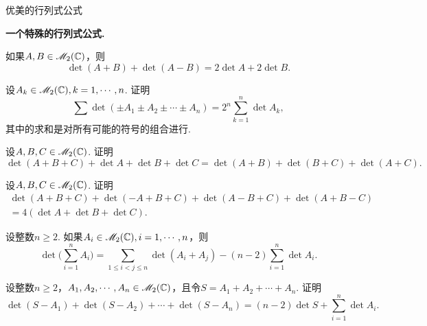 {\kaishu 优美的行列式公式}
\begin{mybox}
  \begin{problem}{\bfseries 一个特殊的行列式公式.}
    \begin{enum}
      \item \label{prob1.31.a}如果$A,B\in\mathscr M_2(\mathbb C)$，则
      \[
        \det(A+B) + \det(A-B) = 2\det A + 2\det B.
      \]
      \item 设$A_k\in\mathscr M_2(\mathbb C),k=1,\cdots,n$. 证明
      \[
        \sum\det(\pm A_1\pm A_2\pm\cdots \pm A_n) = 2^n\sum_{k=1}^n\det A_k,
      \]
      其中的求和是对所有可能的符号的组合进行.
    \end{enum}
  \end{problem}
\end{mybox}

\begin{mybox}
  \begin{problem}
  设$A,B,C\in\mathscr M_2(\mathbb C)$. 证明
  \[
    \det (A+B+C) + \det A + \det B + \det C =
    \det(A+B) + \det(B+C) + \det(A+C).
  \]
  \end{problem}
\end{mybox}

\begin{mybox}
  \begin{problem}
  设$A,B,C\in\mathscr M_2(\mathbb C)$. 证明
  \begin{gather*}
    \det(A+B+C) + \det(-A+B+C) + \det(A-B+C) + \det(A+B-C) \\
    = 4(\det A + \det B + \det C).
  \end{gather*}
  \end{problem}
\end{mybox}

\begin{mybox}
  \begin{problem}
  设整数$n\ge2$. 如果$A_i\in\mathscr M_2(\mathbb C),i=1,\cdots,n$，则
  \[
    \det \bigg( \sum_{i=1}^n A_i \bigg) =
    \sum_{1\le i<j\le n}\det(A_i+A_j) - (n-2)\sum_{i=1}^n\det A_i.
  \]
  \end{problem}
\end{mybox}

\begin{mybox}
  \begin{problem}
  设整数$n\ge2$，$A_1,A_2,\cdots,A_n\in\mathscr M_2(\mathbb C)$，且令$S=A_1+A_2+\cdots+A_n$. 证明
  \[
    \det (S-A_1) + \det (S-A_2) + \cdots + \det (S-A_n) = (n-2)\det S + \sum_{i=1}^n\det A_i.
  \]
  \end{problem}
\end{mybox}

